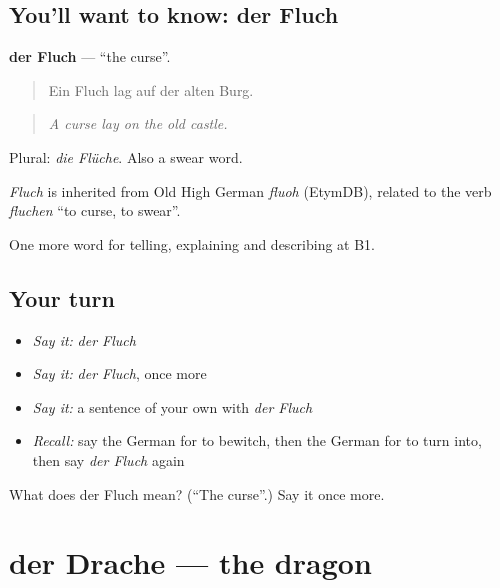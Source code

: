 \subsection*{You'll want to know: der Fluch}
\textbf{der Fluch} — \textquotedblleft{}the curse\textquotedblright{}.

\begin{quote}
Ein Fluch lag auf der alten Burg.
\end{quote}

\begin{quote}
\emph{A curse lay on the old castle.}
\end{quote}

Plural: \emph{die Flüche}. Also a swear word.

\begin{cousinweb}
\emph{Fluch} is inherited from Old High German \emph{fluoh} (EtymDB), related to the verb \emph{fluchen} \textquotedblleft{}to curse, to swear\textquotedblright{}.
\end{cousinweb}

\begin{grammarlens}[title={What you've built}]
One more word for telling, explaining and describing at B1.
\end{grammarlens}

\subsection*{Your turn}
\begin{itemize}
\raggedright
  \item \emph{Say it:} \emph{der Fluch}
  \item \emph{Say it:} \emph{der Fluch}, once more
  \item \emph{Say it:} a sentence of your own with \emph{der Fluch}
  \item \emph{Recall:} say the German for to bewitch, then the German for to turn into, then say \emph{der Fluch} again
\end{itemize}

\begin{tcolorbox}[breakable,colback=teal!4,colframe=teal!35!black,title={Before you move on}]
What does der Fluch mean? (\textquotedblleft{}The curse\textquotedblright{}.) Say it once more.
\end{tcolorbox}
\section[der Drache]{der Drache — the dragon}

